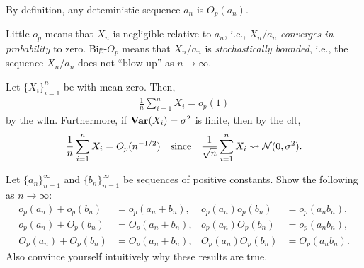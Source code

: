 \documentclass[a4paper,12pt]{article}
\begin{document}
\begin{remark}
	By definition, any deteministic sequence $a_n$ is $O_p(a_n)$.
\end{remark}

\begin{remark}
	Little-$o_p$ means that $X_n$ is negligible relative to $a_n$, i.e., $X_n/a_n$ \emph{converges in probability} to zero.
	Big-$O_p$ means that $X_n/a_n$ is \emph{stochastically bounded}, i.e.,
	the sequence $X_n/a_n$ does not ``blow up'' as $n \to \infty$.
\end{remark}

\begin{example}
	Let $\{X_i\}_{i=1}^{n}$ be  with mean zero.
	Then,
	\begin{align}
		\frac1n\sum_{i=1}^{n}X_i = o_p(1)
	\end{align}
	by the \gls{wlln}.
	Furthermore, if $\operatorname{\text{\textrm{\upshape\textbf{Var}}}}(X_i)=\sigma^2$ is finite, then by the \gls{clt},
	\begin{align}
		\frac1n\sum_{i=1}^{n}X_i = O_p(n^{-1/2})
		\quad\text{since}\quad
		\frac1{\sqrt{n}}\sum_{i=1}^{n}X_i \overset{}{\leadsto} \operatorname{\mathcal{N}}(0,\sigma^2).
	\end{align}
\end{example}

\begin{exercise}\label{eg-arithmetic-op}
	Let $\{a_n\}_{n=1}^{\infty}$ and $\{b_n\}_{n=1}^{\infty}$ be sequences of positive constants.
	Show the following as $n \to \infty$:
	\begin{align*}
		o_p(a_n) + o_p(b_n) &= o_p(a_n + b_n), & o_p(a_n)o_p(b_n) &= o_p(a_nb_n),\\
		o_p(a_n) + O_p(b_n) &= O_p(a_n + b_n), & o_p(a_n)O_p(b_n) &= o_p(a_nb_n),\\
		O_p(a_n) + O_p(b_n) &= O_p(a_n + b_n), & O_p(a_n)O_p(b_n) &= O_p(a_nb_n).
	\end{align*}
	Also convince yourself intuitively why these results are true.
\end{exercise}

\end{document}
